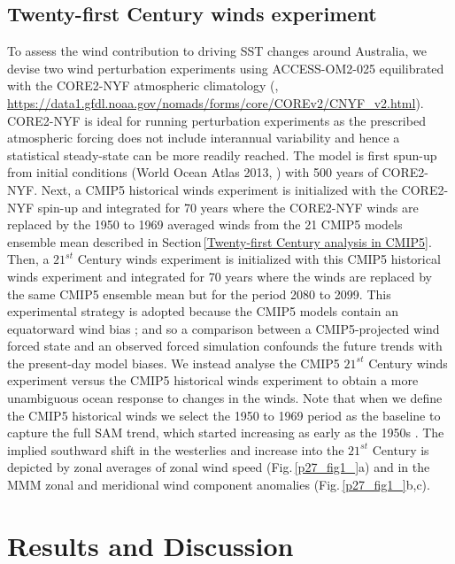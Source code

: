 \documentclass[draft,linenumbers]{agujournal2018}
\begin{document}
\subsection{Twenty-first Century winds experiment} \label{Twenty-first Century winds experiment}
To assess the wind contribution to driving SST changes around Australia, we devise two wind perturbation experiments using ACCESS-OM2-025 equilibrated with the CORE2-NYF atmospheric climatology (\citealp{Large2009},  \url{https://data1.gfdl.noaa.gov/nomads/forms/core/COREv2/CNYF_v2.html}). CORE2-NYF is ideal for running perturbation experiments as the prescribed atmospheric forcing does not include interannual variability and hence a statistical steady-state can be more readily reached. The model is first spun-up from initial conditions (World Ocean Atlas 2013, \citealp{Boyer2013}) with 500 years of CORE2-NYF. Next, a CMIP5 historical winds experiment is initialized with the CORE2-NYF spin-up and integrated for 70 years where the CORE2-NYF winds are replaced by the 1950 to 1969 averaged winds from the 21 CMIP5 models ensemble mean described in Section\,\ref{Twenty-first Century analysis in CMIP5}. Then, a $21^{st}$ Century winds experiment is initialized with this CMIP5 historical winds experiment and integrated for 70 years where the winds are replaced by the same CMIP5 ensemble mean but for the period 2080 to 2099. This experimental strategy is adopted because the CMIP5 models contain an equatorward wind bias \citep{Bracegirdle2013}; and so a comparison between a CMIP5-projected wind forced state and an observed forced simulation confounds the future trends with the present-day model biases. We instead analyse the CMIP5 $21^{st}$ Century winds experiment versus the CMIP5 historical winds experiment to obtain a more unambiguous ocean response to changes in the winds. Note that when we define the CMIP5 historical winds we select the 1950 to 1969 period as the baseline to capture the full SAM trend, which started increasing as early as the 1950s \citep{Marshall2003}. The implied southward shift in the westerlies and increase into the $21^{st}$ Century is depicted by zonal averages of zonal wind speed (Fig.\,\ref{p27_fig1_}a) and in the MMM zonal and meridional wind component anomalies (Fig.\,\ref{p27_fig1_}b,c). 

\section{Results and Discussion}
\end{document}
